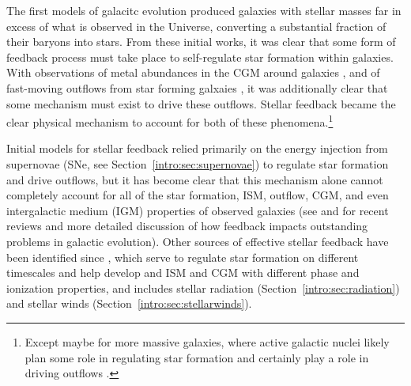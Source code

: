 The first models of galacitc evolution produced galaxies with stellar masses far in excess of what is observed in the Universe, converting a substantial fraction of their baryons into stars. From these initial works, it was clear that some form of feedback process must take place to self-regulate star formation within galaxies. With observations of metal abundances in the CGM around galaxies \citep[see][ for a recent review]{Tumlinson2017}, and of fast-moving outflows from star forming galxaies \citep[see][ for a review]{Veilleux2005}, it was additionally clear that some mechanism must exist to drive these outflows. Stellar feedback became the clear physical mechanism to account for both of these phenomena.\footnote{Except maybe for more massive galaxies, where active galactic nuclei likely plan some role in regulating star formation and certainly play a role in driving outflows \citep[e.g.][]{Fabian2012}.}

Initial models for stellar feedback relied primarily on the energy injection from supernovae (SNe, see Section~\ref{intro:sec:supernovae}) to regulate star formation and drive outflows, but it has become clear that this mechanism alone cannot completely account for all of the star formation, ISM, outflow, CGM, and even intergalactic medium (IGM) properties of observed galaxies (see \cite{SomervilleDave2015} and \cite{NaabOstriker2017} for recent reviews and more detailed discussion of how feedback impacts outstanding problems in galactic evolution). Other sources of effective stellar feedback have been identified since \citep[e.g.][]{Agertz2013}, which serve to regulate star formation on different timescales and help develop and ISM and CGM with different phase and ionization properties, and includes stellar radiation (Section~\ref{intro:sec:radiation}) and stellar winds (Section~\ref{intro:sec:stellarwinds}).

